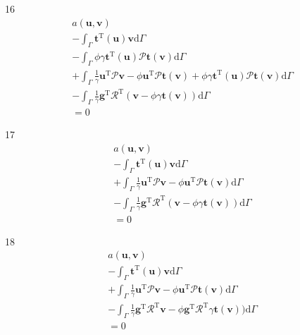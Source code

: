 \documentclass[a4paper,12pt]{article}
\begin{document}
16
\begin{equation}
\begin{split}
a(\mathbf{u},\mathbf{v})
\\-
\int_\Gamma
\mathbf{t}^\textrm{T}(\mathbf{u})\mathbf{v}
\textrm{d}\Gamma
\\-
\int_\Gamma
\phi\gamma\mathbf{t}^{\textrm{T}}(\mathbf{u})\mathcal{P}\mathbf{t}(\mathbf{v})
\textrm{d}\Gamma
\\+
\int_\Gamma
\frac{1}{\gamma}
\mathbf{u}^\textrm{T}\mathcal{P}\mathbf{v}
-
\phi\mathbf{u}^\textrm{T}\mathcal{P}\mathbf{t}(\mathbf{v})
+
\phi\gamma\mathbf{t}^\textrm{T}(\mathbf{u})\mathcal{P}\mathbf{t}(\mathbf{v})
\textrm{d}\Gamma
\\-
\int_\Gamma
\frac{1}{\gamma}
\mathbf{g}^\textrm{T}\mathcal{R}^\textrm{T}
(\mathbf{v}-\phi\gamma\mathbf{t}(\mathbf{v}))
\textrm{d}\Gamma
\\=
0
\end{split}
\end{equation}

17
\begin{equation}
\begin{split}
a(\mathbf{u},\mathbf{v})
\\-
\int_\Gamma
\mathbf{t}^\textrm{T}(\mathbf{u})\mathbf{v}
\textrm{d}\Gamma
\\+
\int_\Gamma
\frac{1}{\gamma}
\mathbf{u}^\textrm{T}\mathcal{P}\mathbf{v}
-
\phi\mathbf{u}^\textrm{T}\mathcal{P}\mathbf{t}(\mathbf{v})
\textrm{d}\Gamma
\\-
\int_\Gamma
\frac{1}{\gamma}
\mathbf{g}^\textrm{T}\mathcal{R}^\textrm{T}
(\mathbf{v}-\phi\gamma\mathbf{t}(\mathbf{v}))
\textrm{d}\Gamma
\\=
0
\end{split}
\end{equation}

18
\begin{equation}
\begin{split}
a(\mathbf{u},\mathbf{v})
\\-
\int_\Gamma
\mathbf{t}^\textrm{T}(\mathbf{u})\mathbf{v}
\textrm{d}\Gamma
\\+
\int_\Gamma
\frac{1}{\gamma}
\mathbf{u}^\textrm{T}\mathcal{P}\mathbf{v}
-
\phi\mathbf{u}^\textrm{T}\mathcal{P}\mathbf{t}(\mathbf{v})
\textrm{d}\Gamma
\\-
\int_\Gamma
\frac{1}{\gamma}
\mathbf{g}^\textrm{T}\mathcal{R}^\textrm{T}
\mathbf{v}
-
\phi\mathbf{g}^\textrm{T}\mathcal{R}^\textrm{T}\gamma\mathbf{t}(\mathbf{v}))
\textrm{d}\Gamma
\\=
0
\end{split}
\end{equation}
\end{document}
